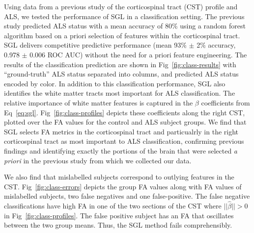 Using data from a previous study of the corticospinal tract (CST) profile and
ALS\cite{sarica2017corticospinal}, we tested the performance of SGL in a
classification setting. The previous study predicted ALS status with a mean
accuracy of 80\% using a random forest algorithm based on a priori selection of
features within the corticospinal tract. SGL delivers competitive predictive
performance (mean 93\% $\pm$ 2\% accuracy, 0.978 $\pm$ 0.006 ROC AUC) without
the need for a priori feature engineering. The results of the classification
prediction are shown in Fig~\ref{fig:class-results} with ``ground-truth'' ALS
status separated into columns, and predicted ALS status encoded by color. In
addition to this classification performance, SGL also identifies the white
matter tracts most important for ALS classification. The relative importance of
white matter features is captured in the $\beta$ coefficients from
Eq~\eqref{eq:sgl}. Fig~\ref{fig:class-profiles} depicts these coefficients along
the right CST, plotted over the FA values for the control and ALS subject
groups. We find that SGL selects
FA metrics in the corticospinal tract and particualrly in the right
corticospinal tract as most important to ALS classification, confirming previous
findings\cite{van2011upper, toosy2003diffusion, sarica2014tractography,
sage2007quantitative, sage2009quantitative, karlsborg2004corticospinal,
ellis1999diffusion, cosottini2005diffusion, ciccarelli2009investigation,
abe2010voxel} and identifying exactly the portions of the brain that were
selected \emph{a priori} in the previous study from which we collected our
data\cite{sarica2017corticospinal}.

We also find that mislabelled subjects correspond to outlying features in the
CST. Fig~\ref{fig:class-errors} depicts the group FA values along with
FA values of mislabelled subjects, two false negatives and one false-positive.
The false negative classifications have high FA in one of the two sections of
the CST where $||\hat{\beta}|| > 0$ in Fig~\ref{fig:class-profiles}.
The false positive subject has an FA that oscillates between the two group
means. Thus, the SGL method fails comprehensibly.

